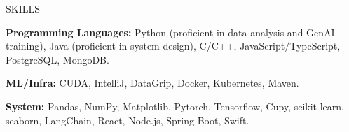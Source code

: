 \begin{rSection}{SKILLS}
    \setlength{\parskip}{0pt}
    \setlength{\baselineskip}{-10pt}
    
    {\bf Programming Languages:} Python (proficient in data analysis and GenAI training), Java (proficient in system design), C/C++, JavaScript/TypeScript, PostgreSQL, MongoDB.
    
    \vspace{1pt}
    
    {\bf ML/Infra:} CUDA, IntelliJ, DataGrip, Docker, Kubernetes, Maven.
    
    \vspace{1pt}
    
    {\bf System:} Pandas, NumPy, Matplotlib, Pytorch, Tensorflow, Cupy, scikit-learn, seaborn, LangChain, React, Node.js, Spring Boot, Swift.
    
    
    \vspace{2pt}
\end{rSection}